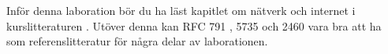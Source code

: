 Inför denna laboration bör du ha läst kapitlet om nätverk och internet 
i kurslitteraturen \citep[kapitel 4]{Brookshear2012csa}.
Utöver denna kan
RFC 791 \citep{RFC791},
5735 \citep{RFC5735} och
2460 \citep{RFC2460}
vara bra att ha som referenslitteratur för några delar av laborationen.
